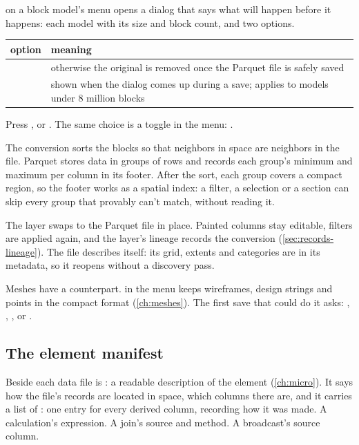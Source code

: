  on a block model's menu opens a dialog that says what will happen before it happens: each model with its size and block count, and two options.

\begin{tabularx}{\linewidth}{@{}LL@{}}\toprule
option & meaning \\ \midrule
{} & otherwise the original is removed once the Parquet file is safely saved \\
 & shown when the dialog comes up during a save; applies to models under 8 million blocks \\
\bottomrule
\end{tabularx}

Press , or . The same choice is a toggle in the  menu: .

The conversion sorts the blocks so that neighbors in space are neighbors in the file. Parquet stores data in groups of rows and records each group's minimum and maximum per column in its footer. After the sort, each group covers a compact region, so the footer works as a spatial index: a filter, a selection or a section can skip every group that provably can't match, without reading it.

The layer swaps to the Parquet file in place. Painted columns stay editable, filters are applied again, and the layer's lineage records the conversion (\cref{sec:records-lineage}). The file describes itself: its grid, extents and categories are in its metadata, so it reopens without a discovery pass.

Meshes have a counterpart.  in the  menu keeps wireframes, design strings and points in the compact  format (\cref{ch:meshes}). The first save that could do it asks: , , , or .

\subsection{The element manifest}\label{sec:store-manifest}
Beside each data file is : a readable description of the element (\cref{ch:micro}). It says how the file's records are located in space, which columns there are, and it carries a list of : one entry for every derived column, recording how it was made. A calculation's expression. A join's source and method. A broadcast's source column.

